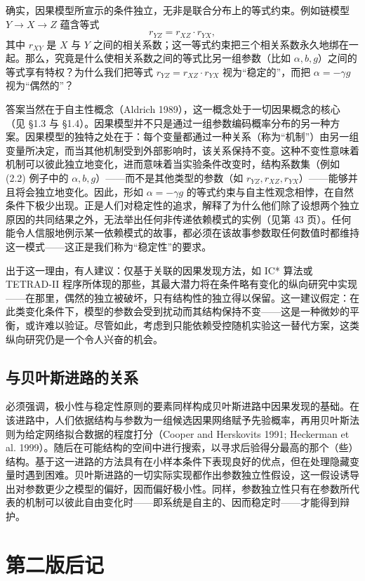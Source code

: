 确实，因果模型所宣示的条件独立，无非是联合分布上的等式约束。例如链模型 $Y\to X\to Z$ 蕴含等式
\[
r_{YZ}=r_{XZ}\cdot r_{YX},
\]
其中 $r_{XY}$ 是 $X$ 与 $Y$ 之间的相关系数；这一等式约束把三个相关系数永久地绑在一起。那么，究竟是什么使相关系数之间的等式比另一组参数（比如 $\alpha,b,g$）之间的等式享有特权？为什么我们把等式 $r_{YZ}=r_{XZ}\cdot r_{YX}$ 视为“稳定的”，而把 $\alpha=-\gamma g$ 视为“偶然的”？

答案当然在于自主性概念（Aldrich 1989），这一概念处于一切因果概念的核心（见 \S 1.3 与 \S 1.4）。因果模型并不只是通过一组参数编码概率分布的另一种方案。因果模型的独特之处在于：每个变量都通过一种关系（称为“机制”）由另一组变量所决定，而当其他机制受到外部影响时，该关系保持不变。这种不变性意味着机制可以彼此独立地变化，进而意味着当实验条件改变时，结构系数集（例如 \textup{(2.2)} 例子中的 $\alpha,b,g$）——而不是其他类型的参数（如 $r_{YZ},r_{XZ},r_{YX}$）——能够并且将会独立地变化。因此，形如 $\alpha=-\gamma g$ 的等式约束与自主性观念相悖，在自然条件下极少出现。正是人们对稳定性的追求，解释了为什么他们除了设想两个独立原因的共同结果之外，无法举出任何非传递依赖模式的实例（见第 43 页）。任何能令人信服地例示某一依赖模式的故事，都必须在该故事参数取任何数值时都维持这一模式——这正是我们称为“稳定性”的要求。

出于这一理由，有人建议：仅基于关联的因果发现方法，如 IC* 算法或 TETRAD-II 程序所体现的那些，其最大潜力将在条件略有变化的纵向研究中实现——在那里，偶然的独立被破坏，只有结构性的独立得以保留。这一建议假定：在此类变化条件下，模型的参数会受到扰动而其结构保持不变——这是一种微妙的平衡，或许难以验证。尽管如此，考虑到只能依赖受控随机实验这一替代方案，这类纵向研究仍是一个令人兴奋的机会。

\subsection*{与贝叶斯进路的关系}

必须强调，极小性与稳定性原则的要素同样构成贝叶斯进路中因果发现的基础。在该进路中，人们依据结构与参数为一组候选因果网络赋予先验概率，再用贝叶斯法则为给定网络拟合数据的程度打分（Cooper and Herskovits 1991; Heckerman et al. 1999）。随后在可能结构的空间中进行搜索，以寻求后验得分最高的那个（些）结构。基于这一进路的方法具有在小样本条件下表现良好的优点，但在处理隐藏变量时遇到困难。贝叶斯进路的一切实际实现都作出参数独立性假设，这一假设诱导出对参数更少之模型的偏好，因而偏好极小性。同样，参数独立性只有在参数所代表的机制可以彼此自由变化时——即系统是自主的、因而稳定时——才能得到辩护。

\section*{第二版后记}

